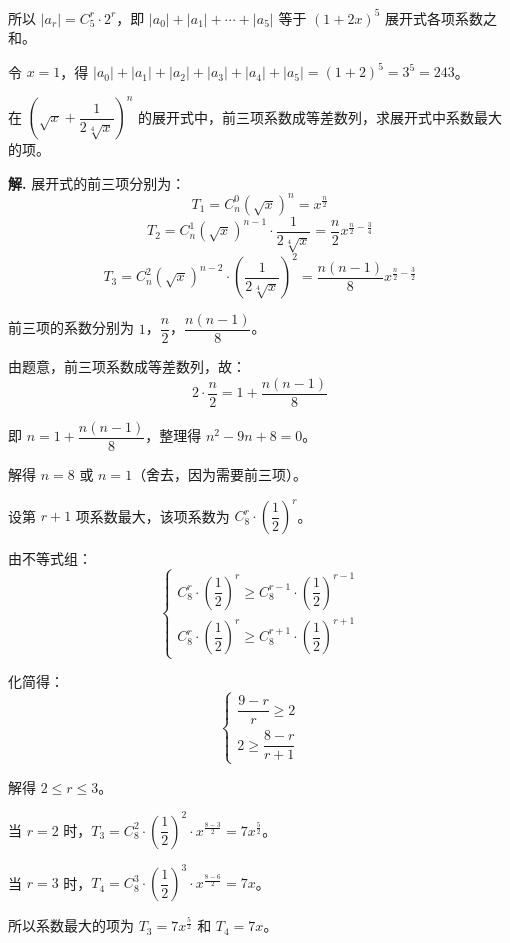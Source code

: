 \documentclass[11pt]{ctexrep}
\begin{document}
所以 $|a_r| = C_5^r \cdot 2^r$，即 $|a_0| + |a_1| + \cdots + |a_5|$ 等于 $(1 + 2x)^5$ 展开式各项系数之和。

令 $x = 1$，得 $|a_0| + |a_1| + |a_2| + |a_3| + |a_4| + |a_5| = (1 + 2)^5 = 3^5 = 243$。

\begin{example}[最大系数问题]
    在 $\left( \sqrt{x} + \dfrac{1}{2\sqrt[4]{x}} \right)^n$ 的展开式中，前三项系数成等差数列，求展开式中系数最大的项。
\end{example}

\textbf{解.} 展开式的前三项分别为：
\[
    T_1 = C_n^0 (\sqrt{x})^n = x^{\frac{n}{2}}
\]
\[
    T_2 = C_n^1 (\sqrt{x})^{n-1} \cdot \frac{1}{2\sqrt[4]{x}} = \frac{n}{2} x^{\frac{n}{2} - \frac{3}{4}}
\]
\[
    T_3 = C_n^2 (\sqrt{x})^{n-2} \cdot \left( \frac{1}{2\sqrt[4]{x}} \right)^2 = \frac{n(n-1)}{8} x^{\frac{n}{2} - \frac{3}{2}}
\]

前三项的系数分别为 $1$，$\dfrac{n}{2}$，$\dfrac{n(n-1)}{8}$。

由题意，前三项系数成等差数列，故：
\[
    2 \cdot \frac{n}{2} = 1 + \frac{n(n-1)}{8}
\]

即 $n = 1 + \dfrac{n(n-1)}{8}$，整理得 $n^2 - 9n + 8 = 0$。

解得 $n = 8$ 或 $n = 1$（舍去，因为需要前三项）。

设第 $r+1$ 项系数最大，该项系数为 $C_8^r \cdot \left( \dfrac{1}{2} \right)^r$。

由不等式组：
\[
    \begin{cases}
        C_8^r \cdot \left( \dfrac{1}{2} \right)^r \geq C_8^{r-1} \cdot \left( \dfrac{1}{2} \right)^{r-1} \\[6pt]
        C_8^r \cdot \left( \dfrac{1}{2} \right)^r \geq C_8^{r+1} \cdot \left( \dfrac{1}{2} \right)^{r+1}
    \end{cases}
\]

化简得：
\[
    \begin{cases}
        \dfrac{9-r}{r} \geq 2 \\[4pt]
        2 \geq \dfrac{8-r}{r+1}
    \end{cases}
\]

解得 $2 \leq r \leq 3$。

当 $r = 2$ 时，$T_3 = C_8^2 \cdot \left( \dfrac{1}{2} \right)^2 \cdot x^{\frac{8-3}{2}} = 7x^{\frac{5}{2}}$。

当 $r = 3$ 时，$T_4 = C_8^3 \cdot \left( \dfrac{1}{2} \right)^3 \cdot x^{\frac{8-6}{2}} = 7x$。

所以系数最大的项为 $T_3 = 7x^{\frac{5}{2}}$ 和 $T_4 = 7x$。
\end{document}

